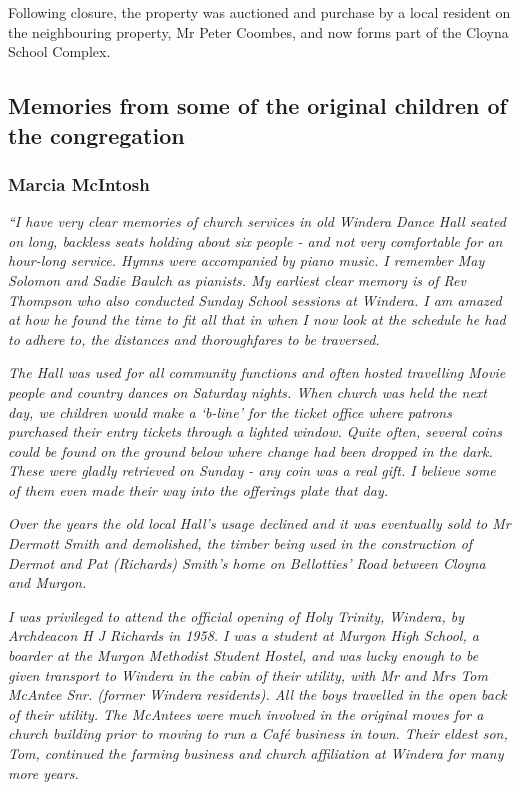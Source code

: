 Following closure, the property was auctioned and purchase by a local resident on the neighbouring property, Mr Peter Coombes, and now forms part of the Cloyna School Complex.



\subsection{Memories from some of the original children of the congregation}



\subsubsection{Marcia McIntosh}



\emph{``I have very clear memories of church services in old Windera Dance Hall seated on long, backless seats holding about six people - and not very comfortable for an hour-long service. Hymns were accompanied by piano music. I remember May Solomon and Sadie Baulch as pianists. My earliest clear memory is of Rev Thompson who also conducted Sunday School sessions at Windera. I am amazed at how he found the time to fit all that in when I now look at the schedule he had to adhere to, the distances and thoroughfares to be traversed.}



\emph{The Hall was used for all community functions and often hosted travelling Movie people and country dances on Saturday nights. When church was held the next day, we children would make a `b-line' for the ticket office where patrons purchased their entry tickets through a lighted window. Quite often, several coins could be found on the ground below where change had been dropped in the dark. These were gladly retrieved on Sunday - any coin was a real gift. I believe some of them even made their way into the offerings plate that day.}



\emph{Over the years the old local Hall's usage declined and it was eventually sold to Mr Dermott Smith and demolished, the timber being used in the construction of Dermot and Pat (Richards) Smith's home on Bellotties' Road between Cloyna and Murgon.}



\emph{I was privileged to attend the official opening of Holy Trinity, Windera, by Archdeacon H J Richards in 1958. I was a student at Murgon High School, a boarder at the Murgon Methodist Student Hostel, and was lucky enough to be given transport to Windera in the cabin of their utility, with Mr and Mrs Tom McAntee Snr. (former Windera residents). All the boys travelled in the open back of their utility. The McAntees were much involved in the original moves for a church building prior to moving to run a Café business in town. Their eldest son, Tom, continued the farming business and church affiliation at Windera for many more years.}



